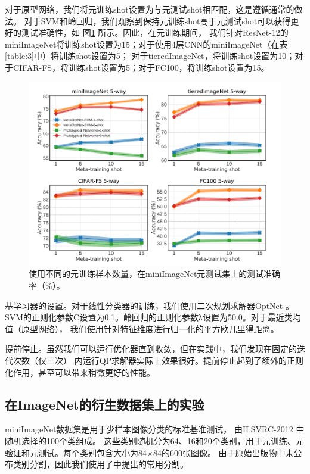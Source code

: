 对于原型网络，我们将元训练shot设置为与元测试shot相匹配，这是遵循通常的做法\cite{snell2017prototypical,gidaris2018dynamic}。
对于SVM和岭回归，我们观察到保持元训练shot高于元测试shot可以获得更好的测试准确性，如 图\ref{fig:2} 所示。因此，在元训练期间，
我们针对ResNet-12的miniImageNet将训练shot设置为15；对于使用4层CNN的miniImageNet（在表\ref{table:3}中）将训练shot设置为5；
对于tieredImageNet，将训练shot设置为10；对于CIFAR-FS，将训练shot设置为5；对于FC100，将训练shot设置为15。

\begin{figure}[htbp]
    \centering
    \includegraphics[width=.7\linewidth]{figure/f2.png}
    \caption{使用不同的元训练样本数量，在miniImageNet元测试集上的测试准确率（\%）。}
    \label{fig:2}
\end{figure}

基学习器的设置。对于线性分类器的训练，我们使用二次规划求解器OptNet \cite{amos2017optnet}。
SVM的正则化参数C设置为0.1。岭回归的正则化参数λ设置为50.0。对于最近类均值（原型网络），
我们使用针对特征维度进行归一化的平方欧几里得距离。

提前停止。虽然我们可以运行优化器直到收敛，但在实践中，我们发现在固定的迭代次数（仅三次）
内运行QP求解器实际上效果很好。提前停止起到了额外的正则化作用，甚至可以带来稍微更好的性能。


\subsection{在ImageNet的衍生数据集上的实验}

miniImageNet数据集\cite{vinyals2016matching}是用于少样本图像分类的标准基准测试，
由ILSVRC-2012 \cite{russakovsky2015imagenet}中随机选择的100个类组成。
这些类别随机分为64、16和20个类别，用于元训练、元验证和元测试。每个类别包含大小为84×84的600张图像。
由于原始出版物\cite{vinyals2016matching}中未公布类别分割，因此我们使用了\cite{ravi2017optimization}中提出的常用分割。

